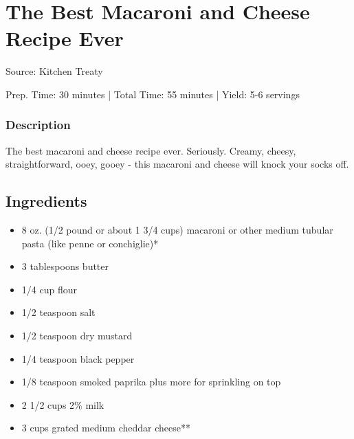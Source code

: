 \section{The Best Macaroni and Cheese Recipe Ever}

Source: Kitchen Treaty

\begin{center}
Prep. Time: 30 minutes |
Total Time: 55 minutes | 
Yield: 5-6 servings
\end{center}

\subsubsection{Description}
The best macaroni and cheese recipe ever. Seriously. Creamy, cheesy, straightforward, ooey, gooey - this macaroni and cheese will knock your socks off.

\subsection{Ingredients}
\begin{multicols}{2}
\begin{itemize}
    \item 8 oz. (1/2 pound or about 1 3/4 cups) macaroni or other medium tubular pasta (like penne or conchiglie)*
    \item 3 tablespoons butter
    \item 1/4 cup flour
    \item 1/2 teaspoon salt
    \item 1/2 teaspoon dry mustard
    \item 1/4 teaspoon black pepper
    \item 1/8 teaspoon smoked paprika plus more for sprinkling on top
    \item 2 1/2 cups 2\% milk
    \item 3 cups grated medium cheddar cheese**
\end{itemize}
\end{multicols}

